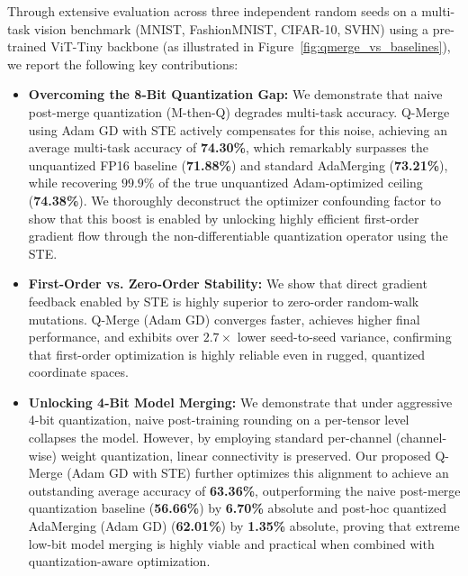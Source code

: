 Through extensive evaluation across three independent random seeds on a multi-task vision benchmark (MNIST, FashionMNIST, CIFAR-10, SVHN) using a pre-trained ViT-Tiny backbone (as illustrated in Figure~\ref{fig:qmerge_vs_baselines}), we report the following key contributions:
\begin{itemize}
    \item \textbf{Overcoming the 8-Bit Quantization Gap:} We demonstrate that naive post-merge quantization (M-then-Q) degrades multi-task accuracy. Q-Merge using Adam GD with STE actively compensates for this noise, achieving an average multi-task accuracy of \textbf{74.30\%}, which remarkably surpasses the unquantized FP16 baseline (\textbf{71.88\%}) and standard AdaMerging (\textbf{73.21\%}), while recovering $99.9\%$ of the true unquantized Adam-optimized ceiling (\textbf{74.38\%}). We thoroughly deconstruct the optimizer confounding factor to show that this boost is enabled by unlocking highly efficient first-order gradient flow through the non-differentiable quantization operator using the STE.
    \item \textbf{First-Order vs. Zero-Order Stability:} We show that direct gradient feedback enabled by STE is highly superior to zero-order random-walk mutations. Q-Merge (Adam GD) converges faster, achieves higher final performance, and exhibits over $2.7\times$ lower seed-to-seed variance, confirming that first-order optimization is highly reliable even in rugged, quantized coordinate spaces.
    \item \textbf{Unlocking 4-Bit Model Merging:} We demonstrate that under aggressive 4-bit quantization, naive post-training rounding on a per-tensor level collapses the model. However, by employing standard per-channel (channel-wise) weight quantization, linear connectivity is preserved. Our proposed Q-Merge (Adam GD with STE) further optimizes this alignment to achieve an outstanding average accuracy of \textbf{63.36\%}, outperforming the naive post-merge quantization baseline (\textbf{56.66\%}) by \textbf{6.70\%} absolute and post-hoc quantized AdaMerging (Adam GD) (\textbf{62.01\%}) by \textbf{1.35\%} absolute, proving that extreme low-bit model merging is highly viable and practical when combined with quantization-aware optimization.
\end{itemize}